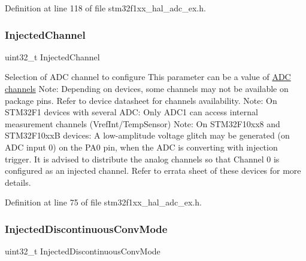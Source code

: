 Definition at line 118 of file stm32f1xx\+\_\+hal\+\_\+adc\+\_\+ex.\+h.

\mbox{\label{struct_a_d_c___injection_conf_type_def_aa74eb880cdada1796f96a2ada0ed64dd}} 
\subsubsection{\texorpdfstring{Injected\+Channel}{InjectedChannel}}
{\footnotesize\ttfamily uint32\+\_\+t Injected\+Channel}

Selection of A\+DC channel to configure This parameter can be a value of \hyperlink{group___a_d_c__channels}{A\+DC channels} Note\+: Depending on devices, some channels may not be available on package pins. Refer to device datasheet for channels availability. Note\+: On S\+T\+M32\+F1 devices with several A\+DC\+: Only A\+D\+C1 can access internal measurement channels (Vref\+Int/\+Temp\+Sensor) Note\+: On S\+T\+M32\+F10xx8 and S\+T\+M32\+F10xxB devices\+: A low-\/amplitude voltage glitch may be generated (on A\+DC input 0) on the P\+A0 pin, when the A\+DC is converting with injection trigger. It is advised to distribute the analog channels so that Channel 0 is configured as an injected channel. Refer to errata sheet of these devices for more details. 

Definition at line 75 of file stm32f1xx\+\_\+hal\+\_\+adc\+\_\+ex.\+h.

\mbox{\label{struct_a_d_c___injection_conf_type_def_a1b7de280b507291a00ab297ced1d0eca}} 
\subsubsection{\texorpdfstring{Injected\+Discontinuous\+Conv\+Mode}{InjectedDiscontinuousConvMode}}
{\footnotesize\ttfamily uint32\+\_\+t Injected\+Discontinuous\+Conv\+Mode}

